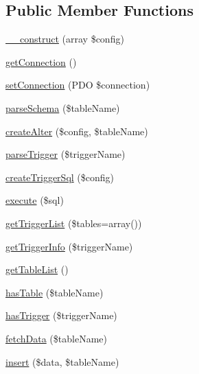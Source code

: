 \subsection*{Public Member Functions}
\begin{DoxyCompactItemize}
\item 
\hyperlink{classDbSync__Table__DbAdapter__Mysql_a74e9a2b77c939b34d82f4b88bccc8151}{\_\-\_\-construct} (array \$config)
\item 
\hyperlink{classDbSync__Table__DbAdapter__Mysql_a3c000f13b6eac670c0dd9c85de31ac49}{getConnection} ()
\item 
\hyperlink{classDbSync__Table__DbAdapter__Mysql_a644d3a69901a0565a480721e652d5fec}{setConnection} (PDO \$connection)
\item 
\hyperlink{classDbSync__Table__DbAdapter__Mysql_af7b83b6b5d51bb77814d52cec3cce5af}{parseSchema} (\$tableName)
\item 
\hyperlink{classDbSync__Table__DbAdapter__Mysql_a02a1f1873924881f4a19cffbee049913}{createAlter} (\$config, \$tableName)
\item 
\hyperlink{classDbSync__Table__DbAdapter__Mysql_a0b16aae79092f4039b42d2deec54b071}{parseTrigger} (\$triggerName)
\item 
\hyperlink{classDbSync__Table__DbAdapter__Mysql_a4275474588eb1708c878b8381a9a9730}{createTriggerSql} (\$config)
\item 
\hyperlink{classDbSync__Table__DbAdapter__Mysql_a9c0b01e49c27d2cabcb5c9245b8f6ad7}{execute} (\$sql)
\item 
\hyperlink{classDbSync__Table__DbAdapter__Mysql_a8a0a871cc633ac6ed3c6cfbac2ea9f01}{getTriggerList} (\$tables=array())
\item 
\hyperlink{classDbSync__Table__DbAdapter__Mysql_ae48113aa663f1fc9b1fda9d52c55fdb5}{getTriggerInfo} (\$triggerName)
\item 
\hyperlink{classDbSync__Table__DbAdapter__Mysql_a91839f71bb8ed628f3e18ce1d8b330ba}{getTableList} ()
\item 
\hyperlink{classDbSync__Table__DbAdapter__Mysql_a79a6ba5c7d73794dfd4e141471ff9e19}{hasTable} (\$tableName)
\item 
\hyperlink{classDbSync__Table__DbAdapter__Mysql_a3099dfb064dcf136150cff82d36ded91}{hasTrigger} (\$triggerName)
\item 
\hyperlink{classDbSync__Table__DbAdapter__Mysql_acefde6ec7836aa5a0106bca42501c37c}{fetchData} (\$tableName)
\item 
\hyperlink{classDbSync__Table__DbAdapter__Mysql_a2f35fe8a01719833f9f0bdeb284e7620}{insert} (\$data, \$tableName)

\end{DoxyCompactItemize}
